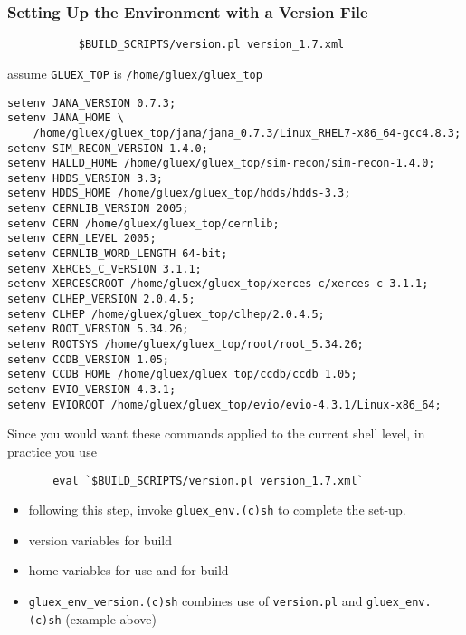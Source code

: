 \documentclass{beamer}
\newcommand{\bi}{\begin{itemize}}
\newcommand{\ei}{\end{itemize}}
\newcommand{\I}{\item}
\begin{document}
\begin{frame}[fragile]
  \frametitle{Setting Up the Environment with a Version File}

\begin{verbatim}
           $BUILD_SCRIPTS/version.pl version_1.7.xml
\end{verbatim}
assume {\tt GLUEX\_TOP} is {\tt /home/gluex/gluex\_top}

{\small
\begin{verbatim}
setenv JANA_VERSION 0.7.3;
setenv JANA_HOME \
    /home/gluex/gluex_top/jana/jana_0.7.3/Linux_RHEL7-x86_64-gcc4.8.3;
setenv SIM_RECON_VERSION 1.4.0;
setenv HALLD_HOME /home/gluex/gluex_top/sim-recon/sim-recon-1.4.0;
setenv HDDS_VERSION 3.3;
setenv HDDS_HOME /home/gluex/gluex_top/hdds/hdds-3.3;
setenv CERNLIB_VERSION 2005;
setenv CERN /home/gluex/gluex_top/cernlib;
setenv CERN_LEVEL 2005;
setenv CERNLIB_WORD_LENGTH 64-bit;
setenv XERCES_C_VERSION 3.1.1;
setenv XERCESCROOT /home/gluex/gluex_top/xerces-c/xerces-c-3.1.1;
setenv CLHEP_VERSION 2.0.4.5;
setenv CLHEP /home/gluex/gluex_top/clhep/2.0.4.5;
setenv ROOT_VERSION 5.34.26;
setenv ROOTSYS /home/gluex/gluex_top/root/root_5.34.26;
setenv CCDB_VERSION 1.05;
setenv CCDB_HOME /home/gluex/gluex_top/ccdb/ccdb_1.05;
setenv EVIO_VERSION 4.3.1;
setenv EVIOROOT /home/gluex/gluex_top/evio/evio-4.3.1/Linux-x86_64;
\end{verbatim}
}
Since you would want these commands applied to the current shell level, in practice you use
\begin{verbatim}
       eval `$BUILD_SCRIPTS/version.pl version_1.7.xml`
\end{verbatim}
\bi
\I following this step, invoke {\tt gluex\_env.(c)sh} to complete the set-up.
\I version variables for build
\I home variables for use and for build
\I {\tt gluex\_env\_version.(c)sh} combines use of {\tt version.pl} and {\tt gluex\_env.(c)sh} (example above)
\ei
\end{frame}
\end{document}

